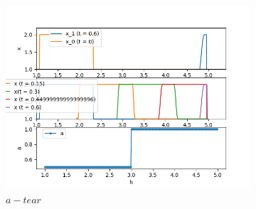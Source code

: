 \documentclass{article}
\begin{document}
\begin{figure}[h]
\begin{subfigure}{0.33\textwidth}
    \end{subfigure}
    \begin{subfigure}{0.33\textwidth}
    {\includegraphics[width=1\linewidth]{tests_bcomp/a_tear_x0_step.png} \\$a - tear$}
    \end{subfigure}
\end{figure}
\end{document}
